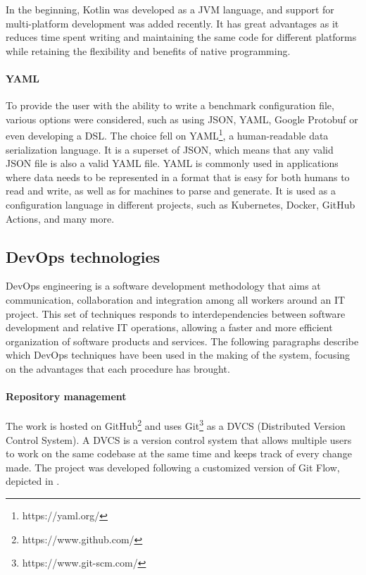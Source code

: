 \documentclass[12pt,a4paper,openright,twoside]{book}
\begin{document}
In the beginning, Kotlin was developed as a JVM language, and support for multi-platform development was added recently. 
It has great advantages as it reduces time spent writing and maintaining the same code for different platforms while retaining the flexibility and benefits of native programming.

\paragraph*{YAML}
To provide the user with the ability to write a benchmark configuration file, various options were considered, such as using JSON, YAML, Google Protobuf or even developing a DSL. 
The choice fell on YAML\footnote{https://yaml.org/}, a human-readable data serialization language. It is a superset of JSON, which means that any valid JSON file is also a valid YAML file.
YAML is commonly used in applications where data needs to be represented in a format that is easy for both humans to read and write, as well as for machines to parse and generate.
It is used as a configuration language in different projects, such as Kubernetes, Docker, GitHub Actions, and many more.

\subsection*{DevOps technologies}
DevOps engineering is a software development methodology that aims at communication, collaboration and integration among all workers around an IT project. 
This set of techniques responds to interdependencies between software development and relative IT operations, allowing a faster and more efficient organization of software products and services.
The following paragraphs describe which DevOps techniques have been used in the making of the system, focusing on the advantages that each procedure has brought.

\paragraph*{Repository management}
The work is hosted on GitHub\footnote{https://www.github.com/} and uses Git\footnote{https://www.git-scm.com/} as a DVCS (Distributed Version Control System).
A DVCS is a version control system that allows multiple users to work on the same codebase at the same time and keeps track of every change made.
The project was developed following a customized version of Git Flow, depicted in . 
\end{document}
